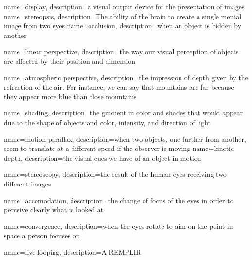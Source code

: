 {
  name=display,
  description={a visual output device for the presentation of images \cite{pimenta2012comprehensive}}
}
{
name=stereopsis,
description={The ability of the brain to create a single mental image from two eyes}
}
{
	name=occlusion,
	description={when an object is hidden by another}
}

{
	name={linear perspective},
	description={the way our visual perception of objects are affected by their position and dimension}
}

{
	name={atmospheric perspective},
	description={the impression of depth given by the refraction of the air. For instance, we can say that mountains are far because they appear more blue than close mountains}
}	

{
	name=shading,
	description={the gradient in color and shades that would appear due to the shape of objects and color, intensity, and direction of light}
}

{
	name={motion parallax},
	description={when two objects, one further from another, seem to translate at a different speed if the observer is moving}
}
{
	name={kinetic depth},
	description={the visual cues we have of an object in motion}
}

{
	name=stereoscopy,
	description={the result of the human eyes receiving two different images}
}

{
	name=accomodation,
	description={the change of focus of the eyes in order to perceive clearly what is looked at}
}

{
	name=convergence,
	description={when the eyes rotate to aim on the point in space a person focuses on}
}


{
	name={live looping},
	description={A REMPLIR}
}